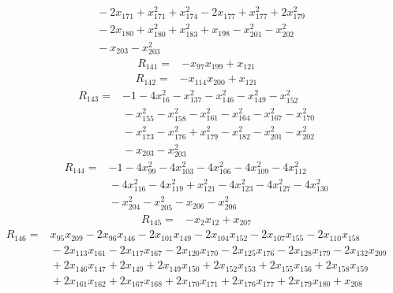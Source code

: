 {\begin{align*}
&{}  - 2x_{171} + x_{171}^{2} + x_{174}^{2} - 2x_{177} + x_{177}^{2} + 2x_{179}^{2} \\
&{}  - 2x_{180} + x_{180}^{2} + x_{183}^{2} + x_{198} - x_{201}^{2} - x_{202}^{2} \\
&{}  - x_{203} - x_{203}^{2}
\end{align*}
\begin{align*}
R_{141} ={}& -x_{97} x_{199} + x_{121}
\end{align*}
\begin{align*}
R_{142} ={}& -x_{114} x_{200} + x_{121}
\end{align*}
\begin{align*}
R_{143} ={}& -1 - 4x_{16}^{2} - x_{137}^{2} - x_{146}^{2} - x_{149}^{2} - x_{152}^{2} \\
&{}  - x_{155}^{2} - x_{158}^{2} - x_{161}^{2} - x_{164}^{2} - x_{167}^{2} - x_{170}^{2} \\
&{}  - x_{173}^{2} - x_{176}^{2} + x_{179}^{2} - x_{182}^{2} - x_{201}^{2} - x_{202}^{2} \\
&{}  - x_{203} - x_{203}^{2}
\end{align*}
\begin{align*}
R_{144} ={}& -1 - 4x_{99}^{2} - 4x_{103}^{2} - 4x_{106}^{2} - 4x_{109}^{2} - 4x_{112}^{2} \\
&{}  - 4x_{116}^{2} - 4x_{119}^{2} + x_{121}^{2} - 4x_{123}^{2} - 4x_{127}^{2} - 4x_{130}^{2} \\
&{}  - x_{204}^{2} - x_{205}^{2} - x_{206} - x_{206}^{2}
\end{align*}
\begin{align*}
R_{145} ={}& -x_{2} x_{12} + x_{207}
\end{align*}
\begin{align*}
R_{146} ={}& x_{95} x_{209} - 2x_{96} x_{146} - 2x_{101} x_{149} - 2x_{104} x_{152} - 2x_{107} x_{155} - 2x_{110} x_{158} \\
&{}  - 2x_{113} x_{161} - 2x_{117} x_{167} - 2x_{120} x_{170} - 2x_{125} x_{176} - 2x_{128} x_{179} - 2x_{132} x_{209} \\
&{}  + 2x_{146} x_{147} + 2x_{149} + 2x_{149} x_{150} + 2x_{152} x_{153} + 2x_{155} x_{156} + 2x_{158} x_{159} \\
&{}  + 2x_{161} x_{162} + 2x_{167} x_{168} + 2x_{170} x_{171} + 2x_{176} x_{177} + 2x_{179} x_{180} + x_{208}

\end{align*}}
